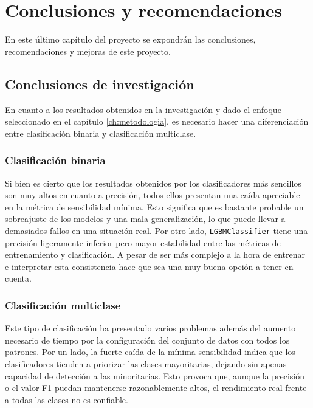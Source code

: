 \chapter{Conclusiones y recomendaciones}
\label{ch:conclusiones}

En este último capítulo del proyecto se expondrán las conclusiones, recomendaciones y mejoras de este proyecto.

\section{Conclusiones de investigación}
\label{sec:conc_investigacion}

En cuanto a los resultados obtenidos en la investigación y dado el enfoque seleccionado en el capítulo \ref{ch:metodologia}, es necesario hacer una diferenciación entre clasificación binaria y clasificación multiclase.

\subsection{Clasificación binaria}
\label{subsec:conc_bin}

Si bien es cierto que los resultados obtenidos por los clasificadores más sencillos son muy altos en cuanto a precisión, todos ellos presentan una caída apreciable en la métrica de sensibilidad mínima. Esto significa que es bastante probable un sobreajuste de los modelos y una mala generalización, lo que puede llevar a demasiados fallos en una situación real. Por otro lado, \texttt{LGBMClassifier} tiene una precisión ligeramente inferior pero mayor estabilidad entre las métricas de entrenamiento y clasificación. A pesar de ser más complejo a la hora de entrenar e interpretar esta consistencia hace que sea una muy buena opción a tener en cuenta.

\newpage
\subsection{Clasificación multiclase}
\label{subsec:conc_multi}

Este tipo de clasificación ha presentado varios problemas además del aumento necesario de tiempo por la configuración del conjunto de datos con todos los patrones. Por un lado, la fuerte caída de la mínima sensibilidad indica que los clasificadores tienden a priorizar las clases mayoritarias, dejando sin apenas capacidad de detección a las minoritarias. Esto provoca que, aunque la precisión o el valor-F1 puedan mantenerse razonablemente altos, el rendimiento real frente a todas las clases no es confiable.

